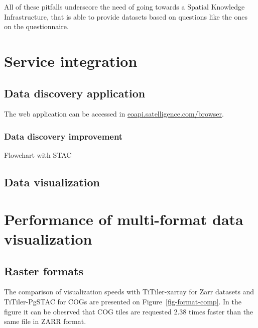 \documentclass[
  oneside,
  open=any]{scrbook}
\begin{document}
All of these pitfalls underscore the need of going towards a Spatial
Knowledge Infrastructure, that is able to provide datasets based on
questions like the ones on the questionnaire.

\section{Service integration}\label{service-integration}

\subsection{Data discovery
application}\label{data-discovery-application}

The web application can be accessed in
\href{https://eoapi.satelligence.com/browser/?.language=en}{eoapi.satelligence.com/browser}.

\subsubsection{Data discovery
improvement}\label{data-discovery-improvement}

Flowchart with STAC

\subsection{Data visualization}\label{data-visualization}

\section{Performance of multi-format data
visualization}\label{performance-of-multi-format-data-visualization}

\subsection{Raster formats}\label{raster-formats}

The comparison of visualization speeds with TiTiler-xarray for Zarr
datasets and TiTiler-PgSTAC for COGs are presented on
Figure~\ref{fig-format-comp}. In the figure it can be obesrved that COG
tiles are requested 2.38 times faster than the same file in ZARR format.
\end{document}
